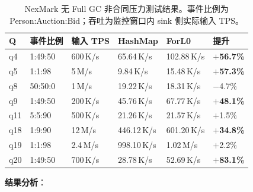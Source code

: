 \documentclass[a4paper,11pt]{article}
\begin{document}
\begin{table}[H]
\centering
\scriptsize
\setlength{\tabcolsep}{3.5pt}
\begin{tabularx}{\textwidth}{C{0.9cm} C{1.8cm} R{1.6cm} R{2.2cm} R{2.2cm} X}
\toprule
\textbf{Q} & \textbf{事件比例} & \textbf{输入 TPS} & \textbf{HashMap} & \textbf{ForL0} & \textbf{提升} \\
\midrule
q4  & 1:49:50  & 600\,K/s & 65.64\,K/s  & 102.88\,K/s & \textbf{$+$56.7\%} \\
q5  & 1:1:98   & 5\,M/s   & 9.84\,K/s   & 15.48\,K/s  & \textbf{$+$57.3\%} \\
q8  & 50:50:0  & 1\,M/s   & 19.22\,K/s  & 18.31\,K/s  & $-$4.7\% \\
q9  & 1:49:50  & 200\,K/s & 45.76\,K/s  & 67.77\,K/s  & \textbf{$+$48.1\%} \\
q11 & 5:5:90   & 500\,K/s & 21.26\,K/s  & 21.57\,K/s  & $+$1.5\% \\
q18 & 1:9:90   & 12\,M/s  & 446.12\,K/s & 601.20\,K/s & \textbf{$+$34.8\%} \\
q19 & 1:1:98   & 2.4\,M/s & 998.10\,K/s & 1.02\,M/s   & $+$2.2\% \\
q20 & 1:49:50  & 700\,K/s & 28.78\,K/s  & 52.69\,K/s  & \textbf{$+$83.1\%} \\
\bottomrule
\end{tabularx}
\caption{NexMark 无 Full GC 非合同压力测试结果。事件比例为 Person:Auction:Bid；吞吐为监控窗口内 sink 侧实际输入 TPS。}
\label{tab:nexmark-no-full-gc}
\end{table}

\textbf{结果分析}：
\end{document}
